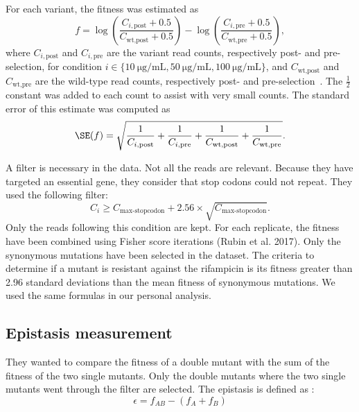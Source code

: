 \documentclass[12pt]{article}
\begin{document}
  For each variant, the fitness was estimated as 
  \begin{equation}\label{eq:fitnessscore}
    f = \log\left(\frac{C_{i, \text{post}} + 0.5}{C_{\text{wt}, \text{post}} +
    0.5}\right) - 
    \log\left(\frac{C_{i, \text{pre}} + 0.5}{C_{\text{wt}, \text{pre}} +
    0.5}\right),
  \end{equation}
  where $C_{i, \text{post}}$ and $C_{i, \text{pre}}$ are the variant read
  counts, respectively post- and pre-selection, for condition
  $i\in\{\SI{10}{\micro\gram\per\milli\liter},
  \SI{50}{\micro\gram\per\milli\liter},
  \SI{100}{\micro\gram\per\milli\liter}\}$, and $C_{\text{wt}, \text{post}}$
  and $C_{\text{wt}, \text{pre}}$ are the wild-type read counts, respectively
  post- and pre-selection~\cite{rubin2017}. The $\frac{1}{2}$ constant was
  added to each count to assist with very small counts. The standard error of
  this estimate was computed as
  \begin{equation}\label{eq:fitnesserror}
    \SE(f) = \sqrt{\frac{1}{C_{i, \text{post}}} + \frac{1}{C_{i, \text{pre}}} +
    \frac{1}{C_{\text{wt}, \text{post}}} + \frac{1}{C_{\text{wt},
    \text{pre}}}}.
  \end{equation}

  A filter is necessary in the data. Not all the reads are relevant. Because
  they have targeted an essential gene, they consider that stop codons could
  not repeat. They used the following filter:
  \begin{equation}\label{eq:stopfilter}
    C_{i} \geq C_{\text{max-stopcodon}} + 2.56 \times
    \sqrt{C_{\text{max-stopcodon}}}.
  \end{equation}
  Only the reads following this condition are kept. For each replicate, the
  fitness have been combined using Fisher score iterations (Rubin et al. 2017).
  Only the synonymous mutations have been selected in the dataset. The criteria
  to determine if a mutant is resistant against the rifampicin is its fitness
  greater than 2.96 standard deviations than the mean fitness of synonymous
  mutations.
  \newline
  \newline
  We used the same formulas in our personal analysis.

  \subsection{Epistasis measurement}

  They wanted to compare the fitness of a double mutant with the sum of the
  fitness of the two single mutants. Only the double mutants where the two
  single mutants went through the filter are selected. The epistasis is defined
  as :
  $$ \epsilon = f_{AB} - (f_{A} + f_{B}) $$
\end{document}
